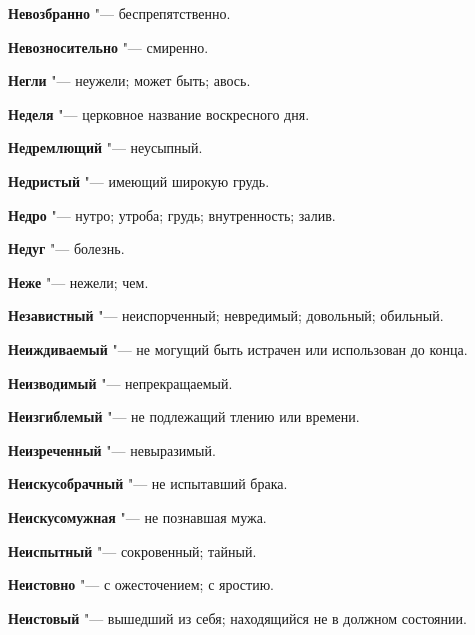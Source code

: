 \begin{mymulticols}{2}
\noindent\textbf{Невозбранно} "--- беспрепятственно. 




\noindent\textbf{Невозносительно} "--- смиренно. 




\noindent\textbf{Негли} "--- неужели; может быть; авось. 




\noindent\textbf{Неделя} "--- церковное название воскресного дня. 




\noindent\textbf{Недремлющий} "--- неусыпный. 




\noindent\textbf{Недристый} "--- имеющий широкую грудь. 




\noindent\textbf{Недро} "--- нутро; утроба; грудь; внутренность; залив. 




\noindent\textbf{Недуг} "--- болезнь. 




\noindent\textbf{Неже} "--- нежели; чем. 




\noindent\textbf{Независтный} "--- неиспорченный; невредимый; довольный; обильный. 




\noindent\textbf{Неиждиваемый} "--- не могущий быть истрачен или использован до конца. 




\noindent\textbf{Неизводимый} "--- непрекращаемый. 




\noindent\textbf{Неизгиблемый} "--- не подлежащий тлению или времени. 




\noindent\textbf{Неизреченный} "--- невыразимый. 




\noindent\textbf{Неискусобрачный} "--- не испытавший брака. 




\noindent\textbf{Неискусомужная} "--- не познавшая мужа. 




\noindent\textbf{Неиспытный} "--- сокровенный; тайный. 




\noindent\textbf{Неистовно} "--- с ожесточением; с яростию. 




\noindent\textbf{Неистовый} "--- вышедший из себя; находящийся не в должном состоянии. 





\end{mymulticols}
